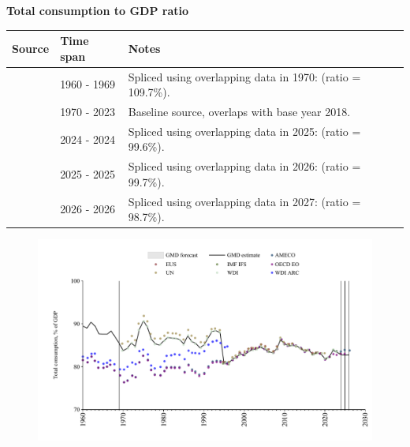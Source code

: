 \documentclass[12pt,a4paper,landscape]{article}
\begin{document}
\begin{adjustbox}{max totalsize={\paperwidth}{\paperheight},center}
\begin{minipage}[t][\textheight][t]{\textwidth}
\vspace*{0.5cm}
{}
\begin{center}
{\Large\bfseries Total consumption to GDP ratio}
\end{center}
\vspace{0.5cm}
\begin{table}[H]
\centering
\small
\begin{tabular}{|l|l|l|}
\hline
\textbf{Source} & \textbf{Time span} & \textbf{Notes} \\
\hline
\rowcolor{white}\cite{OECD_EO}& 1960 - 1969 &Spliced using overlapping data in 1970: (ratio = 109.7\%). \\
\rowcolor{lightgray}\cite{WDI}& 1970 - 2023 &Baseline source, overlaps with base year 2018. \\
\rowcolor{white}\cite{IMF_IFS}& 2024 - 2024 &Spliced using overlapping data in 2025: (ratio = 99.6\%). \\
\rowcolor{lightgray}\cite{OECD_EO}& 2025 - 2025 &Spliced using overlapping data in 2026: (ratio = 99.7\%). \\
\rowcolor{white}\cite{AMECO}& 2026 - 2026 &Spliced using overlapping data in 2027: (ratio = 98.7\%). \\
\hline
\end{tabular}
\end{table}
\begin{figure}[H]
\centering
\includegraphics[width=\textwidth,height=0.6\textheight,keepaspectratio]{graphs/GBR_cons_GDP.pdf}
\end{figure}
\end{minipage}
\end{adjustbox}
\end{document}
